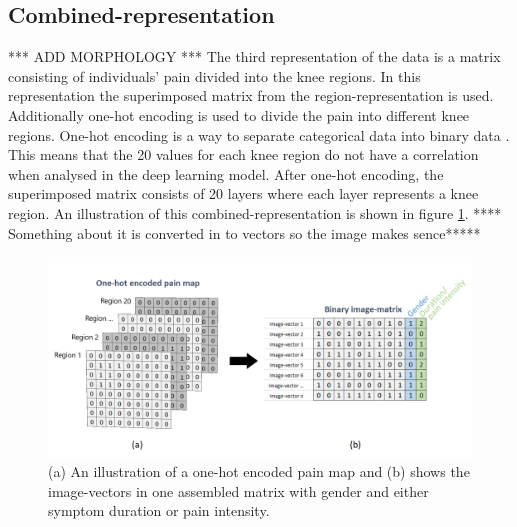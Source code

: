 \subsection{Combined-representation} \label{sec:combined}
*** ADD MORPHOLOGY ***
The third representation of the data is a matrix consisting of individuals’ pain divided into the knee regions.
\noindent
In this representation the superimposed matrix from the region-representation is used. Additionally one-hot encoding is used to divide the pain into different knee regions. One-hot encoding is a way to separate categorical data into binary data \citep{Harris2012}. This means that the 20 values for each knee region do not have a correlation when analysed in the deep learning model. After one-hot encoding, the superimposed matrix consists of 20 layers where each layer represents a knee region. An illustration of this combined-representation is shown in figure \ref{fig:onehot}.
**** Something about it is converted in to vectors so the image makes sence*****

\begin{figure} [H]
\centering
\includegraphics[width=1\textwidth]{figures/onehotmatrix}
\caption{(a) An illustration of a one-hot encoded pain map and (b) shows the image-vectors in one assembled matrix with gender and either symptom duration or pain intensity.}
\label{fig:onehot}
\end{figure}
